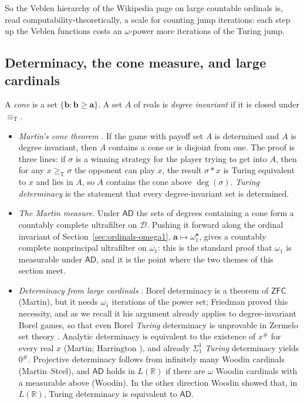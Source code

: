 \documentclass[11pt,a4paper]{article}
\newcommand{\D}{\mathcal D}
\newcommand{\geT}{\geq_{\mathrm T}}
\newcommand{\eqT}{\equiv_{\mathrm T}}
\newcommand{\adeg}{\mathbf a}\newcommand{\bdeg}{\mathbf b}
\theoremstyle{definition}\newtheorem{definition}[theorem]{Definition}
\theoremstyle{remark}\newtheorem{remark}[theorem]{Remark}
\begin{document}
So the Veblen hierarchy of the Wikipedia page on large countable ordinals is, read computability-theoretically, a scale for counting jump iterations: each step up the Veblen functions costs an $\omega$-power more iterations of the Turing jump.

\subsection{Determinacy, the cone measure, and large cardinals}
\label{sec:ordinals-ad}
A \emph{cone} is a set $\{\bdeg:\bdeg\ge\adeg\}$. A set $A$ of reals is \emph{degree invariant} if it is closed under $\eqT$.
\begin{itemize}
\item \emph{Martin's cone theorem} \cite{MartinCone}. If the game with payoff set $A$ is determined and $A$ is degree invariant, then $A$ contains a cone or is disjoint from one. The proof is three lines: if $\sigma$ is a winning strategy for the player trying to get into $A$, then for any $x\geT\sigma$ the opponent can play $x$, the result $\sigma*x$ is Turing equivalent to $x$ and lies in $A$, so $A$ contains the cone above $\deg(\sigma)$. \emph{Turing determinacy} is the statement that every degree-invariant set is determined.
\item \emph{The Martin measure.} Under $\mathsf{AD}$ the sets of degrees containing a cone form a countably complete ultrafilter on $\D$. Pushing it forward along the ordinal invariant of Section~\ref{sec:ordinals-omega1}, $\adeg\mapsto\omega_1^{\adeg}$, gives a countably complete nonprincipal ultrafilter on $\omega_1$: this is the standard proof that $\omega_1$ is measurable under $\mathsf{AD}$, and it is the point where the two themes of this section meet.
\item \emph{Determinacy from large cardinals} \cite{Kanamori,KoellnerWoodin}. Borel determinacy is a theorem of $\mathsf{ZFC}$ (Martin), but it needs $\omega_1$ iterations of the power set; Friedman proved this necessity, and as we recall it his argument already applies to degree-invariant Borel games, so that even Borel \emph{Turing} determinacy is unprovable in Zermelo set theory \cite{FriedmanHigher}. Analytic determinacy is equivalent to the existence of $x^\#$ for every real $x$ (Martin; Harrington \cite{HarringtonSharp}), and already $\Sigma^1_1$ \emph{Turing} determinacy yields $0^\#$. Projective determinacy follows from infinitely many Woodin cardinals (Martin--Steel), and $\mathsf{AD}$ holds in $L(\mathbb R)$ if there are $\omega$ Woodin cardinals with a measurable above (Woodin). In the other direction Woodin showed that, in $L(\mathbb R)$, Turing determinacy is equivalent to $\mathsf{AD}$.

\end{itemize}
\end{document}
